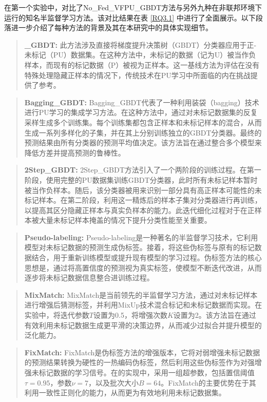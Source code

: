 在第一个实验中，对比了No\_Fed\_VFPU\_GBDT方法与另外九种在非联邦环境下运行的知名半监督学习方法。该对比结果在表 \ref{RQ3.1} 中进行了全面展示。以下段落进一步介绍了每种方法的背景及其在本研究中的具体实现细节。

\begin{quote}
	\textbf{\_GBDT:} 此方法涉及直接将梯度提升决策树（GBDT）分类器应用于正-未标记（PU）数据集。在这种方法中，未标记的数据（记为U）被当作负样本，而现有的标记数据（P）被视为正样本。这一基线方法为评估在没有特殊处理隐藏正样本的情况下，传统技术在PU学习中所面临的内在挑战提供了参考。
\end{quote}

\begin{quote}
	\textbf{Bagging\_GBDT:} Bagging\_GBDT代表了一种利用装袋（bagging）技术进行PU学习的集成学习方法。在这种方法中，通过对未标记数据集的反复采样生成多个训练集。每个训练集都包含正样本和未标记样本的混合，从而生成一系列多样化的子集，并在其上分别训练独立的GBDT分类器。最终的预测结果由所有分类器的预测平均值决定。该方法旨在通过整合多个模型来降低方差并提高预测的鲁棒性。
\end{quote}

\begin{quote}
	\textbf{2Step\_GBDT:} 2Step\_GBDT方法引入了一个两阶段的训练过程。在第一阶段，使用完整的PU数据集训练GBDT分类器，此时所有未标记样本暂时被当作负样本。随后，该分类器被用来识别一部分具有高正样本可能性的未标记样本。在第二阶段，利用这一精炼后的样本子集对分类器进行再训练，以提高其区分隐藏正样本与真实负样本的能力。此迭代细化过程对于在正样本被大量未标记样本掩盖的情况下提升分类性能至关重要。
\end{quote}

\begin{quote}
	\textbf{Pseudo-labeling:} Pseudo-labeling是一种著名的半监督学习技术，它利用模型对未标记数据的预测生成伪标签。接着，将这些伪标签与原有的标记数据结合，用于重新训练模型或提升现有模型的学习过程。伪标签方法的核心思想是，通过将高置信度的预测视为真实标签，使模型不断迭代改进，从而逐步将未标记数据信息整合进训练过程。
\end{quote}

\begin{quote}
	\textbf{MixMatch:} MixMatch是当前领先的半监督学习方法，通过对未标记样本进行增强后猜测标签，并利用MixUp技术混合标记和未标记数据而实现。在实验中，将迭代参数$T$设置为0.5，将增强次数$K$设置为2。该方法旨在通过有效利用未标记数据生成更平滑的决策边界，从而减少过拟合并提升模型的泛化能力。
\end{quote}

\begin{quote}
	\textbf{FixMatch:} FixMatch是伪标签方法的增强版本，它将对弱增强未标记数据的预测结果转换为硬性的一热编码伪标签，然后利用这些伪标签作为对强增强未标记数据的学习信号。在的实现中，采用一组超参数，包括置信阈值$\tau = 0.95$，参数$\nu = 7$，以及批次大小$B = 64$。FixMatch的主要优势在于其利用一致性正则化的能力，从而更为有效地利用未标记数据集。
\end{quote}

